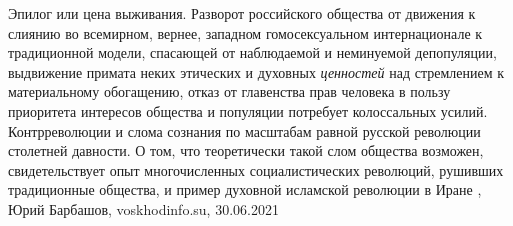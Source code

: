 Эпилог или цена выживания. Разворот российского общества от движения к слиянию во всемирном, вернее,
западном гомосексуальном интернационале к традиционной модели, спасающей от
наблюдаемой и неминуемой депопуляции, выдвижение примата неких этических и
духовных \emph{ценностей} над стремлением к материальному обогащению, отказ от
главенства прав человека в пользу приоритета интересов общества и популяции
потребует колоссальных усилий. Контрреволюции и слома сознания по масштабам
равной русской революции столетней давности. О том, что теоретически такой слом
общества возможен, свидетельствует опыт многочисленных социалистических
революций, рушивших традиционные общества, и пример духовной исламской
революции в Иране
, 
Юрий Барбашов, voskhodinfo.su, 30.06.2021

